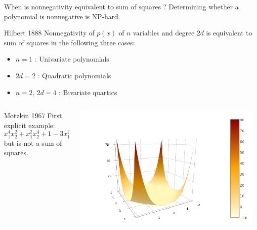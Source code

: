\documentclass{beamer}
\begin{document}
  \begin{frame}{When is nonnegativity equivalent to sum of squares ?}
    Determining whether a polynomial is nonnegative is \alert{NP-hard}.
    \begin{block}{Hilbert 1888}
      Nonnegativity of $p(x)$ of $n$ variables and degree $2d$ is equivalent to sum of squares in the following three cases:
      \begin{itemize}
        \item $n = 1$ : Univariate polynomials
        \item $2d = 2$ : Quadratic polynomials
        \item $n = 2$, $2d = 4$ : Bivariate quartics
      \end{itemize}
    \end{block}
    \begin{columns}
      \begin{column}{0.7\textwidth}
    \begin{block}{Motzkin 1967}
      First explicit example:
      \[ x_1^4x_2^2 + x_1^2x_2^4 + 1 - 3x_1^2x_2^2 \geq 0 \quad \forall x \]
      but is \alert{not} a sum of squares.
    \end{block}
      \end{column}
      \begin{column}{0.3\textwidth}
        \centering
        \includegraphics[trim=3cm .7cm 6cm 3cm, clip, width=\textwidth]{motzkin.png}
      \end{column}
    \end{columns}

  \end{frame}
\end{document}
